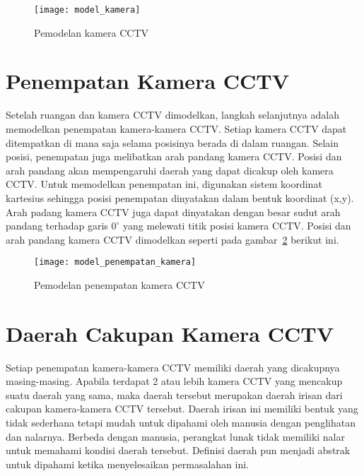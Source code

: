\begin{figure}[H]
	\centering  
	\texttt{[image: model\_kamera]}
	\caption[Pemodelan kamera CCTV]{Pemodelan kamera CCTV} 
	\label{fig:model_kamera}
\end{figure}

\section{Penempatan Kamera CCTV}
Setelah ruangan dan kamera CCTV dimodelkan, langkah selanjutnya adalah memodelkan penempatan kamera-kamera CCTV. Setiap kamera CCTV dapat ditempatkan di mana saja selama posisinya berada di dalam ruangan. Selain posisi, penempatan juga melibatkan arah pandang kamera CCTV. Posisi dan arah pandang akan mempengaruhi daerah yang dapat dicakup oleh kamera CCTV. Untuk memodelkan penempatan ini, digunakan sistem koordinat kartesius sehingga posisi penempatan dinyatakan dalam bentuk koordinat (x,y). Arah padang kamera CCTV juga dapat dinyatakan dengan besar sudut arah pandang terhadap garis \(0^\circ\) yang melewati titik posisi kamera CCTV. Posisi dan arah pandang kamera CCTV dimodelkan seperti pada gambar~\ref{fig:model_penempatan_kamera} berikut ini.

\begin{figure}[H]
	\centering  
	\texttt{[image: model\_penempatan\_kamera]}
	\caption[Pemodelan penempatan kamera CCTV]{Pemodelan penempatan kamera CCTV} 
	\label{fig:model_penempatan_kamera}
\end{figure}

\section{Daerah Cakupan Kamera CCTV}
Setiap penempatan kamera-kamera CCTV memiliki daerah yang dicakupnya masing-masing. Apabila terdapat 2 atau lebih kamera CCTV yang mencakup suatu daerah yang sama, maka daerah tersebut merupakan daerah irisan dari cakupan kamera-kamera CCTV tersebut. Daerah irisan ini memiliki bentuk yang tidak sederhana tetapi mudah untuk dipahami oleh manusia dengan penglihatan dan nalarnya. Berbeda dengan manusia, perangkat lunak tidak memiliki nalar untuk memahami kondisi daerah tersebut. Definisi daerah pun menjadi abstrak untuk dipahami ketika menyelesaikan permasalahan ini.

























